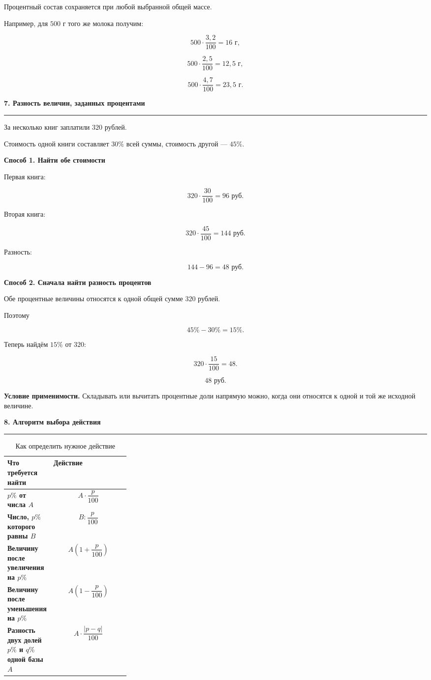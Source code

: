 \documentclass[a4paper,12pt]{article}
\newcommand{\sectiontitle}[1]{%
    \vspace{0.6em}
    {\Large\bfseries\color{darkaccent}#1\par}
    \vspace{0.15em}
    {\color{accent}\rule{\linewidth}{0.6pt}}
    \vspace{0.4em}
}
\newcommand{\subsectiontitle}[1]{%
    \vspace{0.35em}
    {\large\bfseries\color{accent}#1\par}
    \vspace{0.15em}
}
\newcommand{\key}[1]{\textbf{\textcolor{darkaccent}{#1}}}
\begin{document}
Процентный состав сохраняется при любой выбранной общей массе.

Например, для \(500\) г того же молока получим:

\[
500\cdot\frac{3{,}2}{100}=16\text{ г},
\]

\[
500\cdot\frac{2{,}5}{100}=12{,}5\text{ г},
\]

\[
500\cdot\frac{4{,}7}{100}=23{,}5\text{ г}.
\]

\sectiontitle{7. Разность величин, заданных процентами}

За несколько книг заплатили \(320\) рублей.

Стоимость одной книги составляет \(30\%\) всей суммы, стоимость другой ---
\(45\%\).

\subsectiontitle{Способ 1. Найти обе стоимости}

Первая книга:

\[
320\cdot\frac{30}{100}=96\text{ руб.}
\]

Вторая книга:

\[
320\cdot\frac{45}{100}=144\text{ руб.}
\]

Разность:

\[
144-96=48\text{ руб.}
\]

\subsectiontitle{Способ 2. Сначала найти разность процентов}

Обе процентные величины относятся к одной общей сумме \(320\) рублей.

Поэтому

\[
45\%-30\%=15\%.
\]

Теперь найдём \(15\%\) от \(320\):

\[
320\cdot\frac{15}{100}=48.
\]

\[
\boxed{48\text{ руб.}}
\]

\key{Условие применимости.}
Складывать или вычитать процентные доли напрямую можно, когда они
относятся к одной и той же исходной величине.

\sectiontitle{8. Алгоритм выбора действия}

\begin{table}[h]
\centering
\caption{Как определить нужное действие}
\renewcommand{\arraystretch}{1.4}
\begin{tabularx}{\linewidth}{>{\bfseries}p{0.29\linewidth}X}
\toprule
Что требуется найти & Действие \\
\midrule

\(p\%\) от числа \(A\)
&
\[
A\cdot\frac{p}{100}
\]
\\

Число, \(p\%\) которого равны \(B\)
&
\[
B:\frac{p}{100}
\]
\\

Величину после увеличения на \(p\%\)
&
\[
A\left(1+\frac{p}{100}\right)
\]
\\

Величину после уменьшения на \(p\%\)
&
\[
A\left(1-\frac{p}{100}\right)
\]
\\

Разность двух долей \(p\%\) и \(q\%\) одной базы \(A\)
&
\[
A\cdot\frac{|p-q|}{100}
\]
\\

\bottomrule
\end{tabularx}
\end{table}
\end{document}
